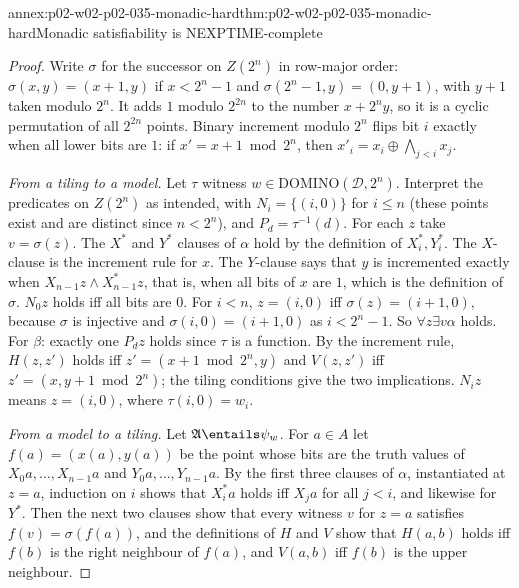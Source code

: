 \begin{annexitem}{annex:p02-w02-p02-035-monadic-hard}{thm:p02-w02-p02-035-monadic-hard}{Monadic satisfiability is NEXPTIME-complete}
\begin{proof}
Write \(\sigma\) for the successor on \(Z(2^n)\) in row-major order:
\(\sigma(x,y)=(x+1,y)\) if \(x<2^n-1\) and \(\sigma(2^n-1,y)=(0,y+1)\), with
\(y+1\) taken modulo \(2^n\).  It adds \(1\) modulo \(2^{2n}\) to the number
\(x+2^ny\), so it is a cyclic permutation of all \(2^{2n}\) points.  Binary
increment modulo \(2^n\) flips bit \(i\) exactly when all lower bits are \(1\):
if \(x'=x+1\bmod2^n\), then \(x'_i=x_i\oplus\bigwedge_{j<i}x_j\).

\emph{From a tiling to a model.}  Let \(\tau\) witness
\(w\in\mathrm{DOMINO}(\mathcal D,2^n)\).  Interpret the predicates on
\(Z(2^n)\) as intended, with \(N_i=\{(i,0)\}\) for \(i\leq n\) (these points
exist and are distinct since \(n<2^n\)), and \(P_d=\tau^{-1}(d)\).  For each
\(z\) take \(v=\sigma(z)\).  The \(X^{*}\) and \(Y^{*}\) clauses of \(\alpha\)
hold by the definition of \(X_i^{*},Y_i^{*}\).  The \(X\)-clause is the
increment rule for \(x\).  The \(Y\)-clause says that \(y\) is incremented
exactly when \(X_{n-1}z\land X_{n-1}^{*}z\), that is, when all bits of \(x\)
are \(1\), which is the definition of \(\sigma\).  \(N_0z\) holds iff all bits
are \(0\).  For \(i<n\), \(z=(i,0)\) iff \(\sigma(z)=(i+1,0)\), because
\(\sigma\) is injective and \(\sigma(i,0)=(i+1,0)\) as \(i<2^n-1\).  So
\(\forall z\exists v\alpha\) holds.  For \(\beta\): exactly one \(P_dz\) holds
since \(\tau\) is a function.  By the increment rule, \(H(z,z')\) holds iff
\(z'=(x+1\bmod2^n,y)\) and \(V(z,z')\) iff \(z'=(x,y+1\bmod2^n)\); the tiling
conditions give the two implications.  \(N_iz\) means \(z=(i,0)\), where
\(\tau(i,0)=w_i\).

\emph{From a model to a tiling.}  Let \(\mathfrak A\entails\psi_w\).  For
\(a\in A\) let \(f(a)=(x(a),y(a))\) be the point whose bits are the truth
values of \(X_0a,\ldots,X_{n-1}a\) and \(Y_0a,\ldots,Y_{n-1}a\).  By the first
three clauses of \(\alpha\), instantiated at \(z=a\), induction on \(i\) shows
that \(X_i^{*}a\) holds iff \(X_ja\) for all \(j<i\), and likewise for
\(Y^{*}\).  Then the next two clauses show that every witness \(v\) for
\(z=a\) satisfies \(f(v)=\sigma(f(a))\), and the definitions of \(H\) and
\(V\) show that \(H(a,b)\) holds iff \(f(b)\) is the right neighbour of
\(f(a)\), and \(V(a,b)\) iff \(f(b)\) is the upper neighbour.


\end{proof}
\end{annexitem}
